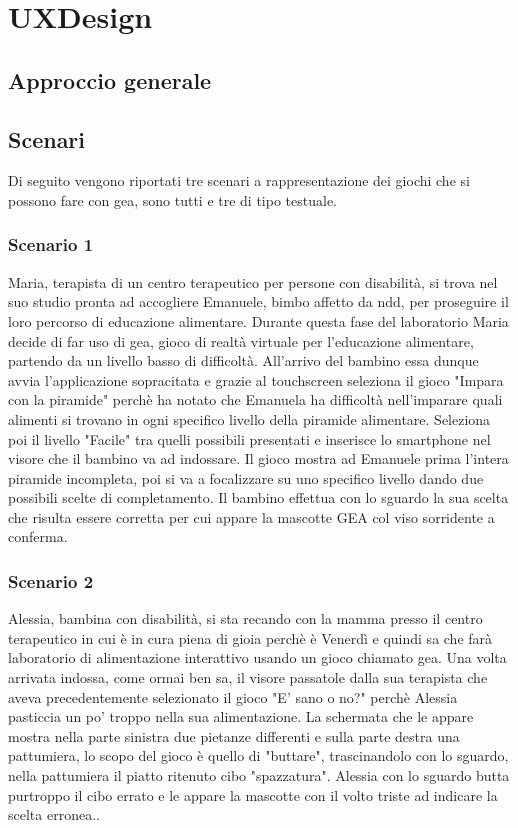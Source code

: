 \section{UXDesign} \label{sec:design}

\subsection{Approccio generale} \label{subsec:app}

\subsection{Scenari} \label{scenari}
Di seguito vengono riportati tre scenari a rappresentazione dei giochi che si possono fare con \acs{gea}, sono tutti e tre di tipo testuale.
\subsubsection{Scenario 1}
Maria, terapista di un centro terapeutico per persone con disabilità, si trova nel suo studio pronta ad accogliere Emanuele, bimbo affetto da \acs{ndd}, per proseguire il loro percorso di educazione alimentare. Durante questa fase del laboratorio Maria decide di far uso di \acs{gea}, gioco di realtà virtuale per l'educazione alimentare, partendo da un livello basso di difficoltà. All'arrivo del bambino essa dunque avvia l'applicazione sopracitata e grazie al touchscreen seleziona il gioco "Impara con la piramide" perchè ha notato che Emanuela ha difficoltà nell'imparare quali alimenti si trovano in ogni specifico livello della piramide alimentare. Seleziona poi il livello "Facile" tra quelli possibili presentati e inserisce lo smartphone nel visore che il bambino va ad indossare. Il gioco mostra ad Emanuele prima l'intera piramide incompleta, poi si va a focalizzare su uno specifico livello dando due possibili scelte di completamento. Il bambino effettua con lo sguardo la sua scelta che risulta essere corretta per cui appare la mascotte GEA col viso sorridente a conferma.
\subsubsection{Scenario 2}
Alessia, bambina con disabilità, si sta recando con la mamma presso il centro terapeutico in cui è in cura piena di gioia perchè è Venerdì e quindi sa che farà laboratorio di alimentazione interattivo usando un gioco chiamato \acs{gea}. Una volta arrivata indossa, come ormai ben sa, il visore passatole dalla sua terapista che aveva precedentemente selezionato il gioco "E' sano o no?" perchè Alessia pasticcia un po' troppo nella sua alimentazione. La schermata che le appare mostra nella parte sinistra due pietanze differenti e sulla parte destra una pattumiera, lo scopo del gioco è quello di "buttare", trascinandolo con lo sguardo, nella pattumiera il piatto ritenuto cibo "spazzatura". Alessia con lo sguardo butta purtroppo il cibo errato e le appare la mascotte con il volto triste ad indicare la scelta erronea..
